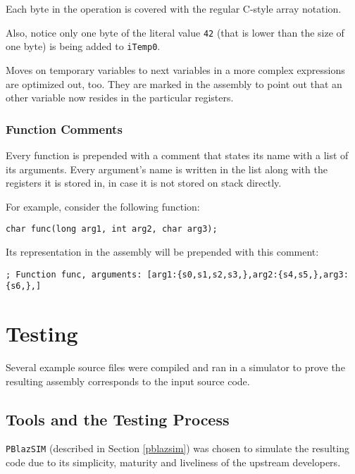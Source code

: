             Each byte in the operation is covered with the regular C-style array notation.

            Also, notice only one byte of the literal value \texttt{42} (that is lower than the size of one byte) is being added to \texttt{iTemp0}. 

            Moves on temporary variables to next variables in a more complex expressions are optimized out, too. They are marked in the assembly to point out that an other variable now resides in the particular registers.

            \subsubsection{Function Comments}

            Every function is prepended with a comment that states its name with a list of its arguments. Every argument's name is written in the list along with the registers it is stored in, in case it is not stored on stack directly.

            For example, consider the following function:

            \begin{center}\texttt{char func(long arg1, int arg2, char arg3);}\end{center}

            Its representation in the assembly will be prepended with this comment:

            \begin{center}\texttt{; Function func, arguments: [arg1:\{s0,s1,s2,s3,\},arg2:\{s4,s5,\},arg3:\{s6,\},]}\end{center}

    \section{Testing}
 
    Several example source files were compiled and ran in a simulator to prove the resulting assembly corresponds to the input source code.

        \subsection{Tools and the Testing Process}

        \texttt{PBlazSIM} (described in Section \ref{pblazsim}) was chosen to simulate the resulting code due to its simplicity, maturity and liveliness of the upstream developers.

